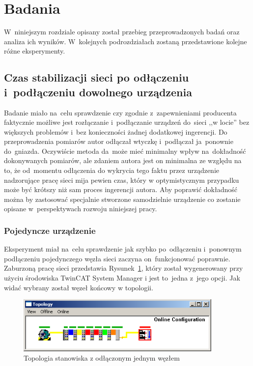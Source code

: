 \section{Badania}
W~niniejszym rozdziale opisany został przebieg przeprowadzonych badań oraz analiza ich wyników. W~kolejnych podrozdziałach zostaną przedstawione kolejne różne eksperymenty. 

\subsection{Czas stabilizacji sieci po odłączeniu i~podłączeniu dowolnego urządzenia}
Badanie miało na~celu sprawdzenie czy zgodnie z~zapewnieniami producenta faktycznie możliwe jest rozłączanie i~podłączanie urządzeń do~sieci ,,w locie'' bez większych problemów i~bez konieczności żadnej dodatkowej ingerencji. Do przeprowadzenia pomiarów autor odłączał wtyczkę i~podłączał ja~ponownie do~gniazda. Oczywiście metoda da~może mieć minimalny wpływ na~dokładność dokonywanych pomiarów, ale zdaniem autora jest on minimalna ze względu na to, że od~momentu odłączenia do wykrycia tego faktu przez urządzenie nadzorujące pracę sieci mija pewien czas, który w optymistycznym przypadku może być krótszy niż sam proces ingerencji autora. Aby poprawić dokładność można by zastosować specjalnie stworzone samodzielnie urządzenie co zostanie opisane w~perspektywach rozwoju niniejszej pracy.

\subsubsection{Pojedyncze urządzenie}
Eksperyment miał na~celu sprawdzenie jak szybko po~odłączeniu i~ponownym podłączeniu pojedynczego węzła sieci zaczyna on~funkcjonować poprawnie. Zaburzoną pracę sieci przedstawia Rysunek~\ref{one_slave}, który został wygenerowany przy użyciu środowiska TwinCAT System Manager i jest to~jedna z~jego opcji. Jak widać wybrany został węzeł końcowy w topologii.

\begin{figure}[!htb] 	\centering 	\includegraphics[width=0.9\textwidth]{images/topologyCXerror} \caption{Topologia stanowiska z odłączonym jednym węzłem} \label{one_slave} \end{figure}

